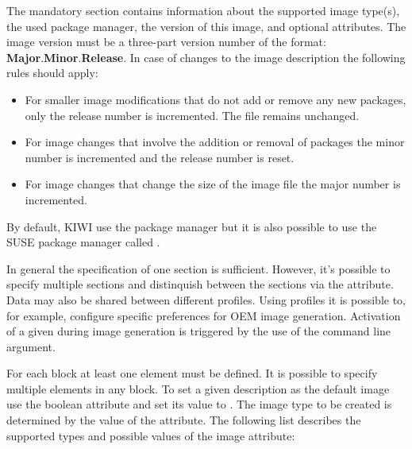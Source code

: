 The mandatory  section contains information about the supported
image type(s), the used package manager, the version of this image, and
optional attributes. The image version must be a three-part version number of
the format: \textbf{Major}.\textbf{Minor}.\textbf{Release}. In case of
changes to the image description the following rules should apply:

\begin{itemize}
\item For smaller image modifications that do not add or remove any
      new packages, only the release number is incremented.
      The  file remains unchanged.
\item For image changes that involve the addition or removal of packages
      the minor number is incremented and the release number is reset.
\item For image changes that change the size of the image file
      the major number is incremented.
\end{itemize}

By default, KIWI use the  package manager but it is also possible
to use the SUSE package manager called . 

In general the specification of one  section is sufficient.
However, it's possible to specify multiple  sections and
distinquish between the sections via the  attribute. Data
may also be shared between different profiles. Using profiles it is possible
to, for example, configure specific preferences for OEM image generation. 
Activation of a given  during image generation is triggered by
the use of the  command line argument.

For each  block at least one  element must be
defined. It is possible to specify multiple  elements in any 
 block. To set a given  description as the default image
use the boolean attribute  and set its value to .
The image type to be created is determined by the value of the 
attribute. The following list describes the supported types and possible
values of the image attribute:

